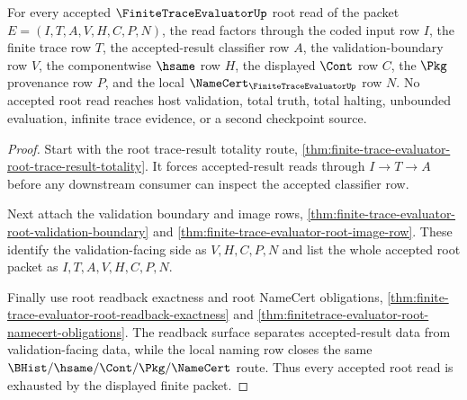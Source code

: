 \begin{theorem}
\label{thm:finite-trace-evaluator-root-acceptance-totality}
For every accepted $\FiniteTraceEvaluatorUp$ root read of the packet
$E=(I,T,A,V,H,C,P,N)$, the read factors through the coded input row $I$, the
finite trace row $T$, the accepted-result classifier row $A$, the
validation-boundary row $V$, the componentwise $\hsame$ row $H$, the displayed
$\Cont$ row $C$, the $\Pkg$ provenance row $P$, and the local
$\NameCert_{\FiniteTraceEvaluatorUp}$ row $N$. No accepted root read reaches
host validation, total truth, total halting, unbounded evaluation, infinite
trace evidence, or a second checkpoint source.
\end{theorem}
\begin{proof}
Start with the root trace-result totality route,
\autoref{thm:finite-trace-evaluator-root-trace-result-totality}. It forces
accepted-result reads through $I \to T \to A$ before any downstream consumer
can inspect the accepted classifier row.

Next attach the validation boundary and image rows,
\autoref{thm:finite-trace-evaluator-root-validation-boundary} and
\autoref{thm:finite-trace-evaluator-root-image-row}. These identify the
validation-facing side as $V,H,C,P,N$ and list the whole accepted root packet
as $I,T,A,V,H,C,P,N$.

Finally use root readback exactness and root NameCert obligations,
\autoref{thm:finite-trace-evaluator-root-readback-exactness} and
\autoref{thm:finitetrace-evaluator-root-namecert-obligations}. The readback
surface separates accepted-result data from validation-facing data, while the
local naming row closes the same $\BHist/\hsame/\Cont/\Pkg/\NameCert$ route.
Thus every accepted root read is exhausted by the displayed finite packet.
\end{proof}

